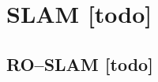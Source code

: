 \begin{comment}
------------------------------------------------------------------------------------------
- \cite{kurth2003experimental}
	- Additionally, we will extend the batch method to produce a variable dimension lter, as used by Deans for the case of bearing-only sensors [3], which would consider some window of previous robot states and optimize the position estimates based on the data in that window.
\end{comment}


\begin{comment}
------------------------------------------------------------------------------------------
Embodied Localisation and Mapping
http://elib.suub.uni-bremen.de/edocs/00103537-1.pdf


- \citez{montemerlo2002fastslam}
	- FastSLAM: A factored solution to the simultaneous localization and mapping problem

- \cite{sarkka2013bayesian}
	- Bayesian filtering and smoothing
- \cite{kurth2003experimental}
	- The Kalman lter approach described in Section 5 can be reformulated for the SLAM problem. To perform SLAM, we include position estimates for each tag in the state, producing a state vector of the form: q(k) = [xk; yk; k; xb1; yb1 ; :::; xbn; ybn]T , where n is the number of beacons.
	
- The purpose of a probabilistic approach to RO-SLAM is to obtain the joint probability distribution of the robot pose (or path) and the map, given all the available data at some instant of time. This distribution represents our knowledge about the robot path, the map, and all their correlations.
\end{comment}
\section{SLAM [todo]}


\begin{comment}
------------------------------------------------------------------------------------------
\end{comment}
\subsection{RO--SLAM [todo]}


